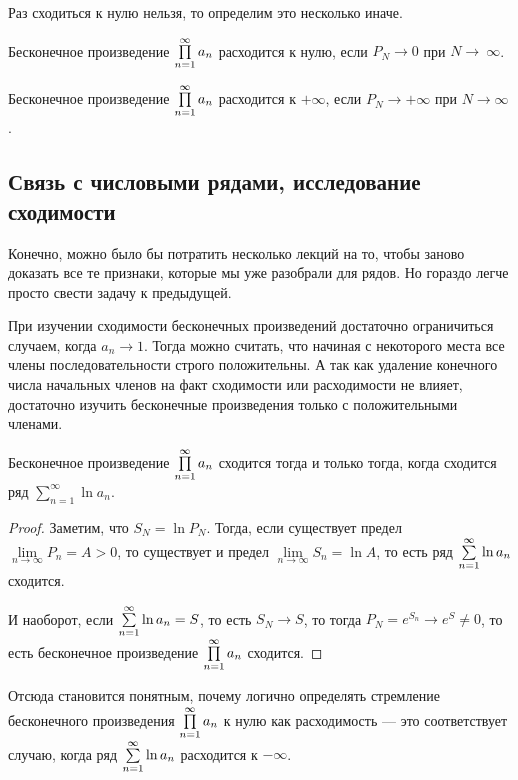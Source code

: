 \documentclass[a4paper, 12pt]{article}
\begin{document}
Раз сходиться к нулю нельзя, то определим это несколько иначе.
\begin{Def}
Бесконечное произведение $\prod\limits_{n=1}^{\infty} a_n$ расходится к нулю, если $P_N \to 0$ при $N \to~\infty$.

Бесконечное произведение $\prod\limits_{n=1}^{\infty} a_n$ расходится к $+\infty$, если $P_N \to +\infty$ при $N \to \infty$.
\end{Def}

\subsection{Связь с числовыми рядами, исследование сходимости}

Конечно, можно было бы потратить несколько лекций на то, чтобы заново доказать все те признаки, которые мы уже разобрали для рядов. Но гораздо легче просто свести задачу к предыдущей.

При изучении сходимости бесконечных произведений достаточно ограничиться случаем, когда $a_n \to 1$. Тогда можно считать, что начиная с некоторого места все члены последовательности строго положительны. А так как удаление конечного числа начальных членов на факт сходимости или расходимости не влияет, достаточно изучить бесконечные произведения только с положительными членами.

\begin{Statement}
Бесконечное произведение $\prod\limits_{n=1}^{\infty} a_n$ сходится тогда и только тогда, когда сходится ряд $\sum\limits_{n=1}^{\infty}\ln a_n$.
\end{Statement}
\begin{proof}
Заметим, что $S_N = \ln P_N$. Тогда, если существует предел $\lim\limits_{n \to \infty} P_n = A > 0$, то существует и предел $\lim\limits_{n\to \infty} S_n = \ln A$, то есть ряд $\sum\limits_{n=1}^{\infty}\ln a_n$ сходится.

И наоборот, если $\sum\limits_{n=1}^{\infty}\ln a_n = S$, то есть $S_N \to S$, то тогда $P_N = e^{S_n} \to e^S \neq 0$, то есть бесконечное произведение $\prod\limits_{n=1}^{\infty} a_n$ сходится. 
\end{proof}

Отсюда становится понятным, почему логично определять стремление бесконечного произведения $\prod\limits_{n=1}^{\infty} a_n$ к нулю как расходимость --- это соответствует случаю, когда ряд $\sum\limits_{n=1}^{\infty}\ln a_n$ расходится к $-\infty$.
\end{document}
